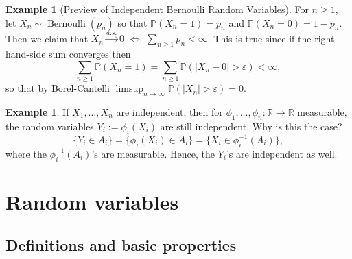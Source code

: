 \documentclass[12pt,reqno]{article}
\theoremstyle{plain}
\theoremstyle{definition}
\newtheorem{example}[theorem]{Example}
\begin{document}
\begin{example}[Preview of Independent Bernoulli Random Variables] 
For $n \geq 1$, let $X_n \sim \operatorname{Bernoulli}(p_n)$ so that 
$\mathbb{P}(X_n = 1) = p_n$ and $\mathbb{P}(X_n = 0) = 1-p_n$. Then 
we claim that $X_n \xrightarrow{a.s.} 0$ $\iff$ 
$\sum_{n \geq 1} p_n < \infty$. This is true since if the right-hand-side 
sum converges then 
\[
\sum_{n \geq 1} \mathbb{P}(X_n = 1) = \sum_{n \geq 1} \mathbb{P}( 
     |X_n - 0| > \varepsilon) < \infty, 
\]
so that by Borel-Cantelli 
$\limsup_{n \rightarrow \infty} \mathbb{P}(|X_n| > \varepsilon) = 0$. 
\end{example} 

\begin{example}
If $X_1,\ldots,X_n$ are independent, then for 
$\phi_1,\ldots,\phi_n: \mathbb{R} \rightarrow \mathbb{R}$ measurable, 
the random variables $Y_i := \phi_i(X_i)$ are still independent. 
Why is this the case? 
\[
\{Y_i \in A_i\} = \{\phi_i(X_i) \in A_i\} = \{X_i \in \phi_i^{-1}(A_i)\}, 
\]
where the $\phi_i^{-1}(A_i)$'s are measurable. Hence, the $Y_i$'s are 
independent as well. 
\end{example} 

\newpage 
\section{Random variables} 

\subsection{Definitions and basic properties} 
\end{document}
